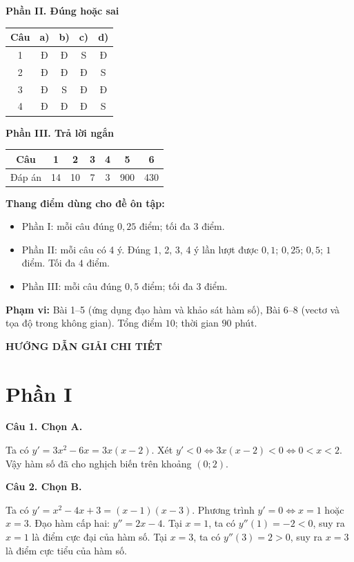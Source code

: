 \documentclass[12pt,a4paper]{article}
\newcommand{\loigiai}[1]{\par\medskip\Needspace{4\baselineskip}\noindent\textbf{#1}\par\nobreak}
\begin{document}
\textbf{Phần II. Đúng hoặc sai}
\begin{center}
\renewcommand{\arraystretch}{1.4}
\begin{tabular}{|c|c|c|c|c|}\hline
Câu & a) & b) & c) & d)\\\hline
1 & Đ & Đ & S & Đ\\\hline
2 & Đ & Đ & Đ & S\\\hline
3 & Đ & S & Đ & Đ\\\hline
4 & Đ & Đ & Đ & S\\\hline
\end{tabular}
\end{center}

\textbf{Phần III. Trả lời ngắn}
\begin{center}
\renewcommand{\arraystretch}{1.5}
\begin{tabular}{|c|c|c|c|c|c|c|}\hline
Câu & 1 & 2 & 3 & 4 & 5 & 6\\\hline
Đáp án & 14 & 10 & 7 & 3 & 900 & 430 \\\hline
\end{tabular}
\end{center}

\textbf{Thang điểm dùng cho đề ôn tập:}
\begin{itemize}[leftmargin=*,itemsep=3pt]
\item Phần I: mỗi câu đúng $0{,}25$ điểm; tối đa $3$ điểm.
\item Phần II: mỗi câu có 4 ý. Đúng 1, 2, 3, 4 ý lần lượt được $0{,}1$; $0{,}25$; $0{,}5$; $1$ điểm. Tối đa $4$ điểm.
\item Phần III: mỗi câu đúng $0{,}5$ điểm; tối đa $3$ điểm.
\end{itemize}
\textbf{Phạm vi:} Bài 1–5 (ứng dụng đạo hàm và khảo sát hàm số), Bài 6–8 (vectơ và tọa độ trong không gian).
Tổng điểm $10$; thời gian $90$ phút.

\newpage
\begin{center}\Large\textbf{HƯỚNG DẪN GIẢI CHI TIẾT}\end{center}
\section*{\large Phần I}
\loigiai{Câu 1. Chọn A.}
Ta có $y'=3x^2-6x=3x(x-2)$.
Xét $y'<0\Leftrightarrow 3x(x-2)<0\Leftrightarrow 0<x<2$.
Vậy hàm số đã cho nghịch biến trên khoảng $(0;2)$.

\loigiai{Câu 2. Chọn B.}
Ta có $y'=x^2-4x+3=(x-1)(x-3)$.
Phương trình $y'=0\Leftrightarrow x=1$ hoặc $x=3$.
Đạo hàm cấp hai: $y''=2x-4$.
Tại $x=1$, ta có $y''(1)=-2<0$, suy ra $x=1$ là điểm cực đại của hàm số.
Tại $x=3$, ta có $y''(3)=2>0$, suy ra $x=3$ là điểm cực tiểu của hàm số.
\end{document}
